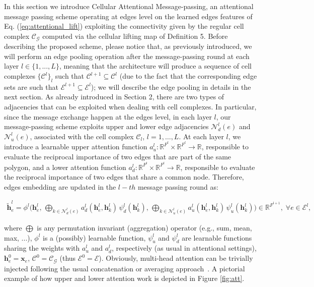 \documentclass{article}
\begin{document}
In this section we introduce Cellular Attentional Message-passing, an attentional message passing scheme operating at edges level on the learned edges features of Eq. (\ref{eq:attentional_lift}) exploiting the connectivity given by the regular cell complex $\mathcal{C}_{\mathcal{G}}$ computed via the cellular lifting map of Definition 5. Before describing the proposed scheme, please notice that, as previously introduced, we will perform an edge pooling operation after the message-passing round at each layer $l \in \{1,...,L\}$, meaning that the architecture will produce a sequence of cell complexes $\{\mathcal{C}^l\}_l$ such that  $\mathcal{C}^{l+1} \subseteq \mathcal{C}^{l}$ (due to the fact that the corresponding edge sets are such that $\mathcal{E}^{l+1} \subseteq \mathcal{E}^{l}$); we will describe the edge pooling in details in the next section. As already introduced in Section 2, there are two types of adjacencies that can be exploited when dealing with cell complexes. In particular, since the message exchange happen at the edges level, in each layer $l$, our message-passing scheme exploits upper and lower edge adjacencies $\mathcal{N}^l_{d}(e)$ and $\mathcal{N}^l_{u}(e)$, associated with the cell complex $\mathcal{C}_{l}$, $l=1,\ldots,L.$ At each layer $l$, we introduce a learnable upper attention function $a^l_{u}: \mathbb{R}^{F^l}  \times \mathbb{R}^{F^l}  \rightarrow \mathbb{R}$, responsible to evaluate the reciprocal importance of two edges that are part of the same polygon, and a lower attention function $a^l_{d}: \mathbb{R}^{F^l} \times \mathbb{R}^{F^l}  \rightarrow \mathbb{R}$, responsible to evaluate the reciprocal importance of two edges that share a common node. Therefore, edges embedding are updated in the $l-th$ message passing round as:

\begin{align}\label{message_passing_scheme}
    \widetilde{\mathbf{h}}_{e}^{l} = \phi^l\Bigg(\mathbf{h}_{e}^{l}, \, \bigoplus_{k \in \mathcal{N}^l_d(e)} a^l_d(\mathbf{h}_{e}^l,\mathbf{h}_{k}^l)\, \psi_d^l(\mathbf{h}_{k}^l), \, \bigoplus_{k \in \mathcal{N}^l_u(e)} a^l_u(\mathbf{h}_{e}^l,\mathbf{h}_{k}^l)\, \psi_u^l(\mathbf{h}_{k}^l) \Bigg) \in \mathbb{R}^{F^{l+1}}, \; \forall e \in \mathcal{E}^l,
\end{align}

where $\bigoplus$ is any permutation invariant (aggregation) operator (e.g., sum, mean, max, ...), $\phi^l$ is a (possibly) learnable function, $\psi_u^l$ and $\psi_d^l$  are  learnable functions sharing the weights with $a^l_u$ and $a^l_d$, respectively (as usual in attentional settings),  $\mathbf{h}_{e}^{0} = \mathbf{x}_{e}$, $\mathcal{C}^0 = \mathcal{C}_{\mathcal{G}}$ (thus $\mathcal{E}^0 = \mathcal{E}$). Obviously, multi-head attention can be trivially injected following the usual concatenation or averaging approach~\cite{giusti22,velivckovic2017graph}. A pictorial example of how upper and lower attention work is depicted in Figure \ref{fig:att}.
\end{document}
